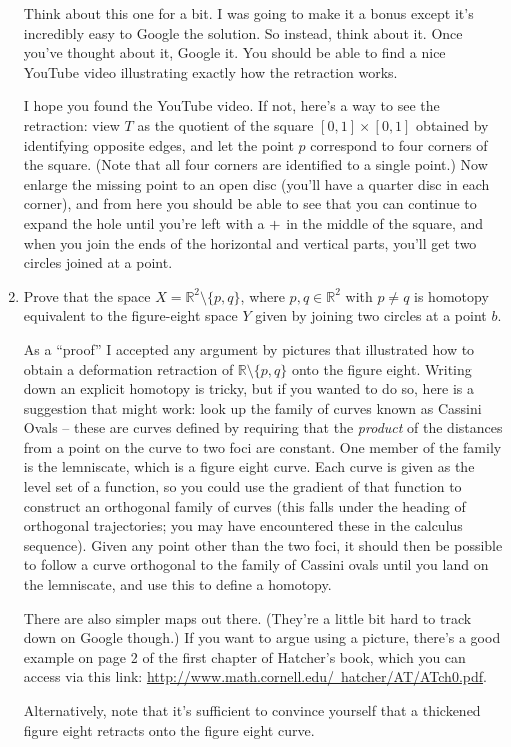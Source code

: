 \documentclass[letterpaper,12pt]{article}
\newcommand{\R}{\mathbb{R}}
\begin{document}
\begin{enumerate}
Think about this one for a bit. I was going to make it a bonus except it's incredibly easy to Google the solution. So instead, think about it. Once you've thought about it, Google it. You should be able to find a nice YouTube video illustrating exactly how the retraction works.

\bigskip

I hope you found the YouTube video. If not, here's a way to see the retraction: view $T$ as the quotient of the square $[0,1]\times [0,1]$ obtained by identifying opposite edges, and let the point $p$ correspond to four corners of the square. (Note that all four corners are identified to a single point.) Now enlarge the missing point to an open disc (you'll have a quarter disc in each corner), and from here you should be able to see that you can continue to expand the hole until you're left with a $\Large{+}$ in the middle of the square, and when you join the ends of the horizontal and vertical parts, you'll get two circles joined at a point.

\item Prove that the space $X = \R^2\setminus \{p,q\}$, where $p,q\in\R^2$ with $p\neq q$ is homotopy equivalent to the figure-eight space $Y$ given by joining two circles at a point $b$.

\bigskip

As a ``proof'' I accepted any argument by pictures that illustrated how to obtain a deformation retraction of $\R\setminus \{p,q\}$ onto the figure eight. Writing down an explicit homotopy is tricky, but if you wanted to do so, here is a suggestion that might work: look up the family of curves known as Cassini Ovals -- these are curves defined by requiring that the {\em product} of the distances from a point on the curve to two foci are constant. One member of the family is the lemniscate, which is a figure eight curve. Each curve is given as the level set of a function, so you could use the gradient of that function to construct an orthogonal family of curves (this falls under the heading of orthogonal trajectories; you may have encountered these in the calculus sequence). Given any point other than the two foci, it should then be possible to follow a curve orthogonal to the family of Cassini ovals until you land on the lemniscate, and use this to define a homotopy.

There are also simpler maps out there. (They're a little bit hard to track down on Google though.) If you want to argue using a picture, there's a good example on page 2 of the first chapter of Hatcher's book, which you can access via this link: \href{http://www.math.cornell.edu/~hatcher/AT/ATch0.pdf}{http://www.math.cornell.edu/~hatcher/AT/ATch0.pdf}.

Alternatively, note that it's sufficient to convince yourself that a thickened figure eight retracts onto the figure eight curve.
\end{enumerate}
\end{document}
